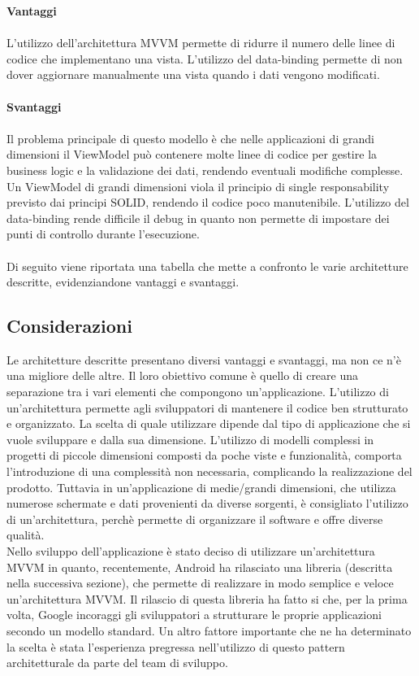 \documentclass[12pt]{report}
\begin{document}
\textbf{Vantaggi}\\\\
L’utilizzo dell'architettura MVVM permette di ridurre il numero delle linee di codice che implementano una vista. L'utilizzo del data-binding permette di non dover aggiornare manualmente una vista quando i dati vengono modificati.
\\
\\\textbf{Svantaggi}\\\\
Il problema principale di questo modello è che nelle applicazioni di grandi dimensioni il ViewModel può contenere molte linee di codice per gestire la business logic e la validazione dei dati, rendendo eventuali modifiche complesse. Un ViewModel di grandi dimensioni viola il principio di single responsability previsto dai principi SOLID\cite{solid}, rendendo il codice poco manutenibile. L'utilizzo del data-binding rende difficile il debug in quanto non permette di impostare dei punti di controllo durante l'esecuzione.
\\\\
Di seguito viene riportata una tabella che mette a confronto le varie architetture descritte, evidenziandone vantaggi e svantaggi.

\newpage
\subsection{Considerazioni}
Le architetture descritte presentano diversi vantaggi e svantaggi, ma non ce n'è una migliore delle altre. Il loro obiettivo comune è quello di creare una separazione tra i vari elementi che compongono un'applicazione. 
L'utilizzo di un'architettura permette agli sviluppatori di mantenere il codice ben strutturato e organizzato. La scelta di quale utilizzare dipende dal tipo di applicazione che si vuole sviluppare e dalla sua dimensione. L'utilizzo di modelli complessi in progetti di piccole dimensioni composti da poche viste e funzionalità, comporta l'introduzione di una complessità non necessaria, complicando la realizzazione del prodotto. Tuttavia in un'applicazione di medie/grandi dimensioni, che utilizza numerose schermate e dati provenienti da diverse sorgenti, è consigliato l'utilizzo di un'architettura, perchè permette di organizzare il software e offre diverse qualità.\\
Nello sviluppo dell'applicazione è stato deciso di utilizzare un'architettura MVVM in quanto, recentemente, Android ha rilasciato una libreria (descritta nella successiva sezione), che permette di realizzare in modo semplice e veloce un'architettura MVVM. Il rilascio di questa libreria ha fatto si che, per la prima volta, Google incoraggi gli sviluppatori a strutturare le proprie applicazioni secondo un modello standard. Un altro fattore importante che ne ha determinato la scelta è stata l'esperienza pregressa nell'utilizzo di questo pattern architetturale da parte del team di sviluppo.
\end{document}
